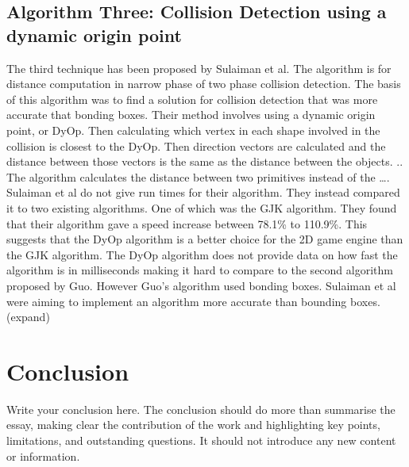 \documentclass{scrartcl}
\begin{document}
\subsection{Algorithm Three: Collision Detection using a dynamic origin point }
The third technique has been proposed by Sulaiman et al.\cite{Sulaiman} The algorithm is for distance computation in narrow phase of two phase collision detection. The basis of this algorithm was to find a solution for collision detection that was more accurate that bonding boxes. Their method involves using a dynamic origin point, or DyOp. Then calculating which vertex in each shape involved in the collision is closest to the DyOp. Then direction vectors are calculated and the distance between those vectors is the same as the distance between the objects. ..
The algorithm calculates the distance between two primitives instead of the ….
Sulaiman et al do not give run times for their algorithm. They instead compared it to two existing algorithms. One of which was the GJK  algorithm. They found that their algorithm gave a speed increase  between 78.1\% to 110.9\%. This suggests that the DyOp algorithm is a better choice for the 2D game engine than the GJK algorithm. The DyOp algorithm does not provide data on how fast the algorithm is in milliseconds making it hard to compare to the second algorithm proposed by Guo. However Guo’s algorithm used bonding boxes. Sulaiman et al were aiming to implement an algorithm more accurate than bounding boxes. (expand)



\section{Conclusion}

Write your conclusion here. The conclusion should do more than summarise the essay, making clear the contribution of the work and highlighting key points, limitations, and outstanding questions. It should not introduce any new content or information.



\end{document}
